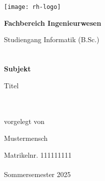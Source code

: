 \begin{titlepage}
    \thispagestyle{empty}
    \hspace{-1cm}\texttt{[image: rh-logo]}\\[1.9cm]
    
    \vspace{2cm}
    \begin{minipage}{\textwidth}
    \hspace{2.5cm}\begin{minipage}{\dimexpr\textwidth-2.5cm\relax}
    {\Large\textbf{Fachbereich Ingenieurwesen}}
    
    {\Large Studiengang Informatik (B.Sc.)}\\
    \\
    \\
    
    
    {\Large\textbf{Subjekt}}
    
    \parbox{\textwidth}{\Large\raggedright Titel}\\
    \\
    
    {\normalsize\fontsize{11pt}{16.5pt}\selectfont vorgelegt von}
    
    {\Large Mustermensch}
    
    {\normalsize\fontsize{11pt}{16.5pt}\selectfont Matrikelnr. 111111111}\\
    \\
    
    {\normalsize Sommersemester 2025}
    \end{minipage}
    \end{minipage}
    
    \vfill
    
\end{titlepage}
